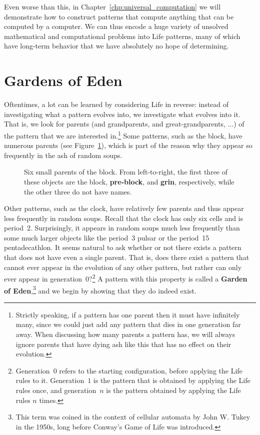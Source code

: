 Even worse than this, in Chapter~\ref{chp:universal_computation} we will demonstrate how to construct patterns that compute anything that can be computed by a computer. We can thus encode a huge variety of unsolved mathematical and computational problems into Life patterns, many of which have long-term behavior that we have absolutely no hope of determining.


\section{Gardens of Eden}\label{sec:goe}

Oftentimes, a lot can be learned by considering Life in reverse: instead of investigating what a pattern evolves into, we investigate what evolves into it. That is, we look for parents (and grandparents, and great-grandparents, ...) of the pattern that we are interested in.\footnote{Strictly speaking, if a pattern has one parent then it must have infinitely many, since we could just add any pattern that dies in one generation far away. When discussing how many parents a pattern has, we will always ignore parents that have dying ash like this that has no effect on their evolution.} Some patterns, such as the block, have numerous parents (see Figure~\ref{fig:block_parents}), which is part of the reason why they appear so frequently in the ash of random soups.

\begin{figure}[!htb]
	\centering{}
	\caption{Six small parents of the block. From left-to-right, the first three of these objects are the block, \textbf{pre-block}, and \textbf{grin}, respectively, while the other three do not have names.}\label{fig:block_parents}
\end{figure}

Other patterns, such as the clock, have relatively few parents and thus appear less frequently in random soups. Recall that the clock has only six cells and is period~2. Surprisingly, it appears in random soups much less frequently than some much larger objects like the period~3 pulsar or the period~15 pentadecathlon. It seems natural to ask whether or not there exists a pattern that does not have even a single parent. That is, does there exist a pattern that cannot ever appear in the evolution of any other pattern, but rather can only ever appear in generation~$0$?\footnote{Generation~$0$ refers to the starting configuration, before applying the Life rules to it. Generation~$1$ is the pattern that is obtained by applying the Life rules once, and generation~$n$ is the pattern obtained by applying the Life rules $n$ times.} A pattern with this property is called a \textbf{Garden of Eden},\footnote{This term was coined in the context of cellular automata by John W. Tukey in the 1950s, long before Conway's Game of Life was introduced.} and we begin by showing that they do indeed exist.

